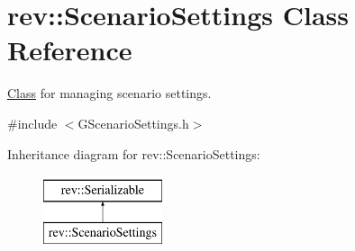 \hypertarget{classrev_1_1_scenario_settings}{}\section{rev\+::Scenario\+Settings Class Reference}
\label{classrev_1_1_scenario_settings}


\mbox{\hyperlink{struct_class}{Class}} for managing scenario settings.  




{\ttfamily \#include $<$G\+Scenario\+Settings.\+h$>$}

Inheritance diagram for rev\+::Scenario\+Settings\+:\begin{figure}[H]
\begin{center}
\leavevmode
\includegraphics[height=2.000000cm]{classrev_1_1_scenario_settings}
\end{center}
\end{figure}
